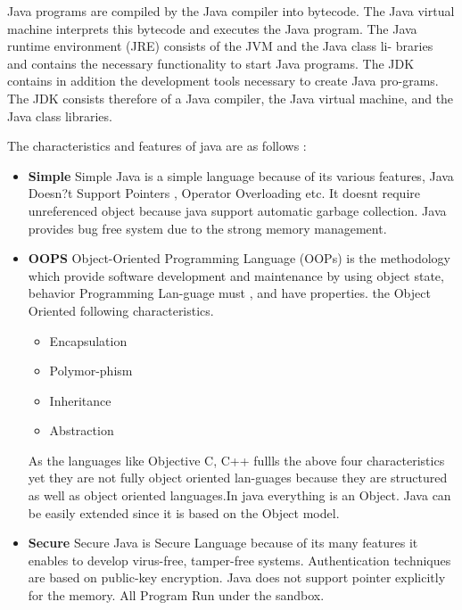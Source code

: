 Java programs are compiled by the Java compiler into bytecode. The Java
virtual machine interprets this bytecode and executes the Java program.
The Java runtime environment (JRE) consists of the JVM and the Java class li-
braries and contains the necessary functionality to start Java programs.
The JDK contains in addition the development tools necessary to create Java
pro-grams. The JDK consists therefore of a Java compiler, the Java virtual
machine, and the Java class libraries.

The characteristics and features of java are as follows :

\begin{itemize}
	\item \textbf{Simple}
Simple Java is a simple language because of its various features, Java
Doesn?t Support Pointers , Operator Overloading etc. It doesnt require
unreferenced object because java support automatic garbage collection.
Java provides bug free system due to the strong memory management.

\item \textbf{OOPS}
Object-Oriented Programming Language (OOPs) is the
methodology which provide software development and maintenance by
using
object
state,
behavior
Programming Lan-guage
must
,
and
have
properties.
the
Object Oriented following characteristics.
\begin{itemize}
	\item Encapsulation
\item Polymor-phism
 \item Inheritance
\item Abstraction

\end{itemize}
As the languages like Objective C, C++ fullls the above four characteristics yet
they are not fully object oriented lan-guages because they are structured
as well as object oriented languages.In java everything is an Object. Java
can be easily extended since it is based on the Object model.
\item \textbf{Secure}
Secure Java is Secure Language because of its many features it enables to
develop virus-free, tamper-free systems. Authentication techniques are
based on public-key encryption. Java does not support pointer explicitly for
the memory. All Program Run under the sandbox.


\end{itemize}
